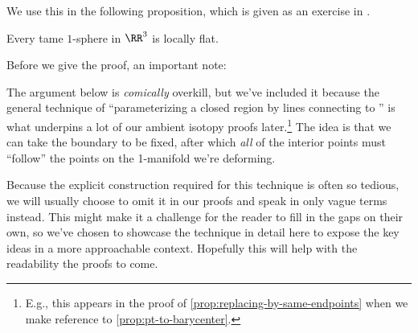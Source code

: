 We use this in the following proposition, which is given as an
exercise in \cite{Daverman}.
\begin{proposition}\label{prop:tame-implies-locally-flat}
  Every tame $1$-sphere in $\RR^3$ is locally flat.
\end{proposition}
Before we give the proof, an important note:
\begin{note}
  The argument below is \emph{comically} overkill, but we've included
  it because the general technique of ``parameterizing a closed region
  by lines connecting  to '' is what underpins a lot of
  our ambient isotopy proofs later.\footnote{E.g., this appears in the
    proof of \cref{prop:replacing-by-same-endpoints} when we make
    reference to \cref{prop:pt-to-barycenter}.} The idea is that we
  can take the boundary to be fixed, after which \emph{all} of the
  interior points must ``follow'' the points on the 1-manifold we're
  deforming.

  Because the explicit construction required for this technique is
  often so tedious, we will usually choose to omit it in our proofs
  and speak in only vague terms instead. This might make it a
  challenge for the reader to fill in the gaps on their own, so we've
  chosen to showcase the technique in detail here to expose the key
  ideas in a more approachable context. Hopefully this will help with
  the readability the proofs to come.
\end{note}
